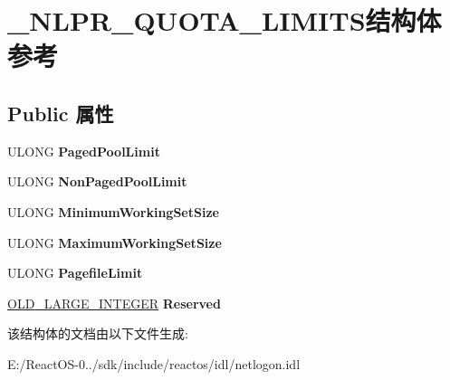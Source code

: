 \hypertarget{struct___n_l_p_r___q_u_o_t_a___l_i_m_i_t_s}{}\section{\+\_\+\+N\+L\+P\+R\+\_\+\+Q\+U\+O\+T\+A\+\_\+\+L\+I\+M\+I\+T\+S结构体 参考}
\label{struct___n_l_p_r___q_u_o_t_a___l_i_m_i_t_s}
\subsection*{Public 属性}
\begin{DoxyCompactItemize}
\item 
\mbox{\label{struct___n_l_p_r___q_u_o_t_a___l_i_m_i_t_s_a892b27dbc8a4075b938a9cafad9dfb50}} 
U\+L\+O\+NG {\bfseries Paged\+Pool\+Limit}
\item 
\mbox{\label{struct___n_l_p_r___q_u_o_t_a___l_i_m_i_t_s_aaf2e21fb31cff1af7a546f387c885162}} 
U\+L\+O\+NG {\bfseries Non\+Paged\+Pool\+Limit}
\item 
\mbox{\label{struct___n_l_p_r___q_u_o_t_a___l_i_m_i_t_s_a7e7f3e0208649963f4c7e589462a431f}} 
U\+L\+O\+NG {\bfseries Minimum\+Working\+Set\+Size}
\item 
\mbox{\label{struct___n_l_p_r___q_u_o_t_a___l_i_m_i_t_s_a6e3ce91626a463a08d3bd557cc0214c9}} 
U\+L\+O\+NG {\bfseries Maximum\+Working\+Set\+Size}
\item 
\mbox{\label{struct___n_l_p_r___q_u_o_t_a___l_i_m_i_t_s_ac1dcce475df6d3374483d5cd9c43e9f8}} 
U\+L\+O\+NG {\bfseries Pagefile\+Limit}
\item 
\mbox{\label{struct___n_l_p_r___q_u_o_t_a___l_i_m_i_t_s_ae2453c569d45929f43d5aa2ad596fc3e}} 
\hyperlink{struct___o_l_d___l_a_r_g_e___i_n_t_e_g_e_r}{O\+L\+D\+\_\+\+L\+A\+R\+G\+E\+\_\+\+I\+N\+T\+E\+G\+ER} {\bfseries Reserved}
\end{DoxyCompactItemize}


该结构体的文档由以下文件生成\+:\begin{DoxyCompactItemize}
\item 
E\+:/\+React\+O\+S-\/0../sdk/include/reactos/idl/netlogon.\+idl\end{DoxyCompactItemize}
